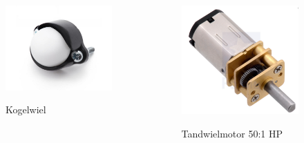 \documentclass
   [kulak] %
   {kulakbeamer}
\begin{document}
\begin{frame}
\begin{columns}
\begin{figure}
			\centering
			\includegraphics[width=.7\textwidth]{ballcaster}
			\caption{\scriptsize Kogelwiel}\cite{BallCaster}
		\end{figure}
		\begin{figure}
			\centering
			\includegraphics[width=.6\textwidth]{gear}
			\caption{\scriptsize Tandwielmotor 50:1 HP}\cite{MicroMetalGearMotor50:1HP}
		\end{figure}
	\end{columns}
\end{frame}
\end{document}
